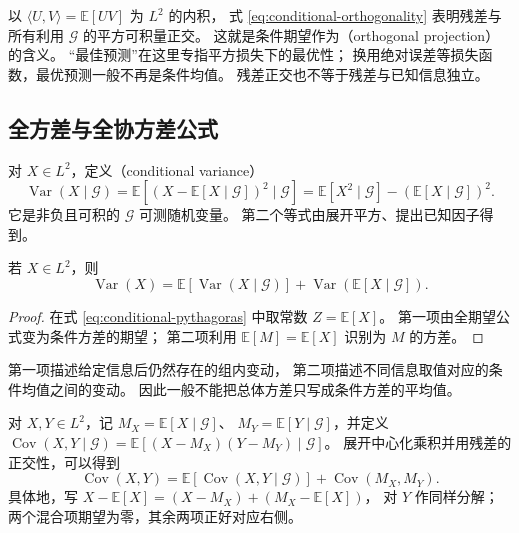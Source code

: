 \documentclass[UTF8]{ctexart}
\begin{document}
以 $\langle U,V\rangle=\mathbb E[UV]$ 为 $L^2$ 的内积，
式 \eqref{eq:conditional-orthogonality} 表明残差与所有利用 $\mathcal G$ 的平方可积量正交。
这就是条件期望作为（orthogonal projection）的含义。
“最佳预测”在这里专指平方损失下的最优性；
换用绝对误差等损失函数，最优预测一般不再是条件均值。
残差正交也不等于残差与已知信息独立。

\subsection{全方差与全协方差公式}

对 $X\in L^2$，定义（conditional variance）
\[
  \operatorname{Var}(X\mid\mathcal G)
  =\mathbb E[(X-\mathbb E[X\mid\mathcal G])^2\mid\mathcal G]
  =\mathbb E[X^2\mid\mathcal G]-(\mathbb E[X\mid\mathcal G])^2.
\]
它是非负且可积的 $\mathcal G$ 可测随机变量。
第二个等式由展开平方、提出已知因子得到。

\begin{proposition}[全方差公式]
\label{prop:conditional-total-variance}
若 $X\in L^2$，则
\begin{equation}
  \operatorname{Var}(X)
  =\mathbb E[\operatorname{Var}(X\mid\mathcal G)]
   +\operatorname{Var}(\mathbb E[X\mid\mathcal G]).
  \label{eq:conditional-total-variance}
\end{equation}
\end{proposition}

\begin{proof}
在式 \eqref{eq:conditional-pythagoras} 中取常数 $Z=\mathbb E[X]$。
第一项由全期望公式变为条件方差的期望；
第二项利用 $\mathbb E[M]=\mathbb E[X]$ 识别为 $M$ 的方差。
\end{proof}

第一项描述给定信息后仍然存在的组内变动，
第二项描述不同信息取值对应的条件均值之间的变动。
因此一般不能把总体方差只写成条件方差的平均值。

对 $X,Y\in L^2$，记 $M_X=\mathbb E[X\mid\mathcal G]$、
$M_Y=\mathbb E[Y\mid\mathcal G]$，并定义
$\operatorname{Cov}(X,Y\mid\mathcal G)
=\mathbb E[(X-M_X)(Y-M_Y)\mid\mathcal G]$。
展开中心化乘积并用残差的正交性，可以得到
\begin{equation}
  \operatorname{Cov}(X,Y)
  =\mathbb E[\operatorname{Cov}(X,Y\mid\mathcal G)]
   +\operatorname{Cov}(M_X,M_Y).
  \label{eq:conditional-total-covariance}
\end{equation}
具体地，写 $X-\mathbb E[X]=(X-M_X)+(M_X-\mathbb E[X])$，
对 $Y$ 作同样分解；两个混合项期望为零，其余两项正好对应右侧。
\end{document}
